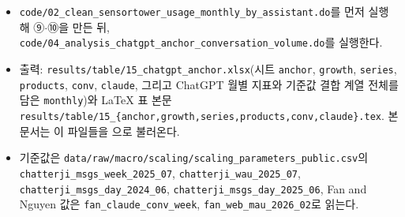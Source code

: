 \documentclass[11pt]{article}
\begin{document}
\begin{itemize}
  \item \texttt{code/02\_clean\_sensortower\_usage\_monthly\_by\_assistant.do}를 먼저 실행해 ⑨$\cdot$⑩을 만든 뒤, \texttt{code/04\_analysis\_chatgpt\_anchor\_conversation\_volume.do}를 실행한다.
  \item 출력: \texttt{results/table/15\_chatgpt\_anchor.xlsx}(시트 \texttt{anchor}, \texttt{growth}, \texttt{series}, \texttt{products}, \texttt{conv}, \texttt{claude}, 그리고 ChatGPT 월별 지표와 기준값 결합 계열 전체를 담은 \texttt{monthly})와 LaTeX 표 본문 \texttt{results/table/15\_\{anchor,growth,series,products,conv,claude\}.tex}. 본 문서는 이 파일들을 \verb||으로 불러온다.
  \item 기준값은 \texttt{data/raw/macro/scaling/scaling\_parameters\_public.csv}의 \texttt{chatterji\_msgs\_week\_2025\_07}, \texttt{chatterji\_wau\_2025\_07}, \texttt{chatterji\_msgs\_day\_2024\_06}, \texttt{chatterji\_msgs\_day\_2025\_06}, Fan and Nguyen 값은 \texttt{fan\_claude\_conv\_week}, \texttt{fan\_web\_mau\_2026\_02}로 읽는다.
\end{itemize}

\printbibliography[title={참고문헌}]
\end{document}
